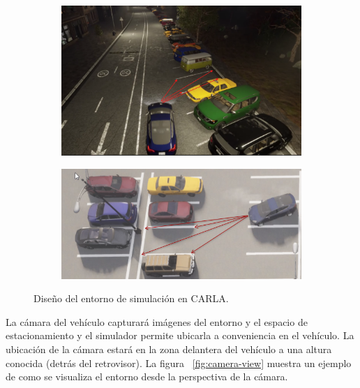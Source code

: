 \begin{figure}[!ht]
    \centering
    \begin{subfigure}{0.4\textwidth}
        \includegraphics[width=\textwidth]{img/distances}\label {fig:distances}
    \end{subfigure}
    \begin{subfigure}{0.4\textwidth}
        \includegraphics[width=\textwidth]{img/distances2}\label {fig:distances2}
    \end{subfigure}
    
    \caption{Diseño del entorno de simulación en CARLA.}
    \label{fig:simulation-design}
\end{figure}

\noindent
La cámara del vehículo capturará imágenes del entorno y el espacio de estacionamiento y el simulador permite ubicarla a conveniencia en el vehículo.
La ubicación de la cámara estará en la zona delantera del vehículo a una altura conocida (detrás del retrovisor).
La figura ~\ref{fig:camera-view} muestra un ejemplo de como se visualiza el entorno desde la perspectiva de la cámara.

